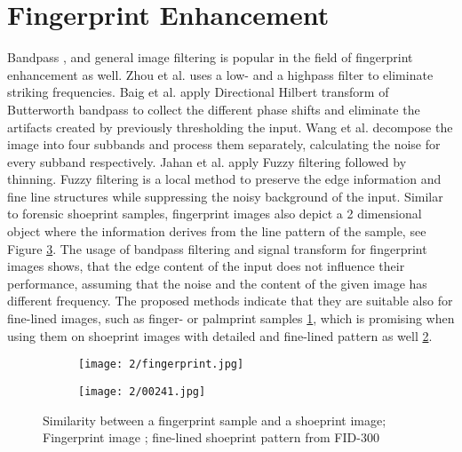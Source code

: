 \documentclass[draft,final]{vutinfth} %
\begin{document}
\section*{Fingerprint Enhancement}
\par
Bandpass \cite{zhou2011adaptive}, \cite{baig2015enhancement} and general image filtering  \cite{jahan2017robust} is popular in the field of fingerprint enhancement as well.
Zhou et al. \cite{zhou2011adaptive} uses a low- and a highpass filter to eliminate striking frequencies. 
Baig et al. \cite{baig2015enhancement} apply Directional Hilbert transform of Butterworth bandpass to collect the different phase shifts and eliminate the artifacts created by previously thresholding the input.
Wang et al. \cite{wang2014enhanced} decompose the image into four subbands and process them separately, calculating the noise for every subband respectively.
Jahan et al. \cite{jahan2017robust} apply Fuzzy filtering followed by thinning.
Fuzzy filtering is a local method to preserve the edge information and fine line structures while suppressing the noisy background of the input.
Similar to forensic shoeprint samples, fingerprint images also depict a 2 dimensional object where the information derives from the line pattern of the sample, see Figure \ref{fig:rw:fingerprint}.
The usage of bandpass filtering and signal transform for fingerprint images shows, that the edge content of the input does not influence their performance, assuming that the noise and the content of the given image has different frequency.
The proposed methods indicate that they are suitable also for fine-lined images, such as finger- or palmprint samples \ref{fig:rw:fp}, which is promising when using them on shoeprint images with detailed and fine-lined pattern as well \ref{fig:rw:ref}. 

\begin{figure}[h]
  \centering
  \begin{subfigure}[t]{0.4\columnwidth}
    \centering
    \texttt{[image: 2/fingerprint.jpg]}
    \subcaption{}
    \label{fig:rw:fp}
  \end{subfigure}
  \begin{subfigure}[t]{0.4\columnwidth}
    \centering
    \texttt{[image: 2/00241.jpg]}
    \subcaption{}
    \label{fig:rw:ref}
  \end{subfigure}
  \caption{Similarity between a fingerprint sample and a shoeprint  image;
		 Fingerprint image \cite{van2016fingerprint};  fine-lined shoeprint pattern from FID-300  \cite{kortylewski2014unsupervised}}
  \label{fig:rw:fingerprint} %
\end{figure}
\end{document}
